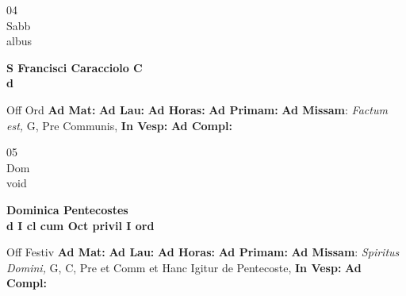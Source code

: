 \documentclass[10pt, openany]{book}
\begin{document}
    \begin{center}
        \begin{minipage}{3.5in}
            \vspace{2em}
            \begin{minipage}{0.5in}
                {\Huge 04} \\
                {\normalsize Sabb} \\
                {\normalsize albus}
            \end{minipage}
            \begin{minipage}{3.0in}
                \textbf{ \large S Francisci Caracciolo C \\
                \textnormal{\normalsize d}} \\ 
            \end{minipage}
            \begin{justify}Off Ord
                \textbf{Ad Mat: }
                \textbf{Ad Lau: }
                \textbf{Ad Horas: }
                \textbf{Ad Primam: }\textbf{Ad Missam}: \textit{Factum est,} G, Pre Communis,  
                \textbf{In Vesp: }
                \textbf{Ad Compl: }
            \end{justify}
        \end{minipage}
    \end{center}

    \begin{center}
        \begin{minipage}{3.5in}
            \vspace{2em}
            \begin{minipage}{0.5in}
                {\Huge 05} \\
                {\normalsize Dom} \\
                {\normalsize void}
            \end{minipage}
            \begin{minipage}{3.0in}
                \textbf{ \large Dominica Pentecostes \\
                \textnormal{\normalsize d I cl cum Oct privil I ord}} \\ 
            \end{minipage}
            \begin{justify}Off Festiv
                \textbf{Ad Mat: }
                \textbf{Ad Lau: }
                \textbf{Ad Horas: }
                \textbf{Ad Primam: }\textbf{Ad Missam}: \textit{Spiritus Domini,} G, C, Pre et Comm et Hanc Igitur de Pentecoste,  
                \textbf{In Vesp: }
                \textbf{Ad Compl: }
            \end{justify}
        \end{minipage}
    \end{center}
\end{document}
